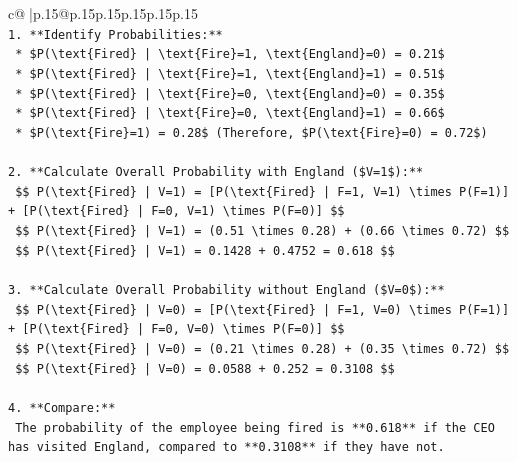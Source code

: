 \documentclass{article}
\begin{document}
{\begin{supertabular}{c@{$\;$}|p{.15\linewidth}@{}p{.15\linewidth}p{.15\linewidth}p{.15\linewidth}p{.15\linewidth}p{.15\linewidth}}
{{{\\ 
\texttt{1.  **Identify Probabilities:**} \\
\texttt{    *   \$P(\textbackslash{}text\{Fired\} | \textbackslash{}text\{Fire\}=1, \textbackslash{}text\{England\}=0) = 0.21\$} \\
\texttt{    *   \$P(\textbackslash{}text\{Fired\} | \textbackslash{}text\{Fire\}=1, \textbackslash{}text\{England\}=1) = 0.51\$} \\
\texttt{    *   \$P(\textbackslash{}text\{Fired\} | \textbackslash{}text\{Fire\}=0, \textbackslash{}text\{England\}=0) = 0.35\$} \\
\texttt{    *   \$P(\textbackslash{}text\{Fired\} | \textbackslash{}text\{Fire\}=0, \textbackslash{}text\{England\}=1) = 0.66\$} \\
\texttt{    *   \$P(\textbackslash{}text\{Fire\}=1) = 0.28\$ (Therefore, \$P(\textbackslash{}text\{Fire\}=0) = 0.72\$)} \\
\\ 
\texttt{2.  **Calculate Overall Probability with England (\$V=1\$):**} \\
\texttt{    \$\$ P(\textbackslash{}text\{Fired\} | V=1) = {[}P(\textbackslash{}text\{Fired\} | F=1, V=1) \textbackslash{}times P(F=1){]} + {[}P(\textbackslash{}text\{Fired\} | F=0, V=1) \textbackslash{}times P(F=0){]} \$\$} \\
\texttt{    \$\$ P(\textbackslash{}text\{Fired\} | V=1) = (0.51 \textbackslash{}times 0.28) + (0.66 \textbackslash{}times 0.72) \$\$} \\
\texttt{    \$\$ P(\textbackslash{}text\{Fired\} | V=1) = 0.1428 + 0.4752 = 0.618 \$\$} \\
\\ 
\texttt{3.  **Calculate Overall Probability without England (\$V=0\$):**} \\
\texttt{    \$\$ P(\textbackslash{}text\{Fired\} | V=0) = {[}P(\textbackslash{}text\{Fired\} | F=1, V=0) \textbackslash{}times P(F=1){]} + {[}P(\textbackslash{}text\{Fired\} | F=0, V=0) \textbackslash{}times P(F=0){]} \$\$} \\
\texttt{    \$\$ P(\textbackslash{}text\{Fired\} | V=0) = (0.21 \textbackslash{}times 0.28) + (0.35 \textbackslash{}times 0.72) \$\$} \\
\texttt{    \$\$ P(\textbackslash{}text\{Fired\} | V=0) = 0.0588 + 0.252 = 0.3108 \$\$} \\
\\ 
\texttt{4.  **Compare:**} \\
\texttt{    The probability of the employee being fired is **0.618** if the CEO has visited England, compared to **0.3108** if they have not.} \\
}}}
\end{supertabular}}
\end{document}

